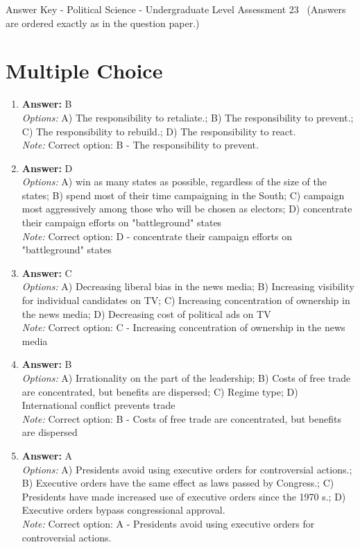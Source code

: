 \documentclass[12pt]{article}
\begin{document}
\begin{center}
Answer Key - Political Science - Undergraduate Level Assessment 23 \
\small (Answers are ordered exactly as in the question paper.)
\end{center}

\section*{Multiple Choice}
\begin{enumerate}[label=\arabic*.]
\item \textbf{Answer:} B
\\ \textit{Options:} A) The responsibility to retaliate.; B) The responsibility to prevent.; C) The responsibility to rebuild.; D) The responsibility to react.
\\ \textit{Note:} Correct option: B - The responsibility to prevent.
\item \textbf{Answer:} D
\\ \textit{Options:} A) win as many states as possible, regardless of the size of the states; B) spend most of their time campaigning in the South; C) campaign most aggressively among those who will be chosen as electors; D) concentrate their campaign efforts on "battleground" states
\\ \textit{Note:} Correct option: D - concentrate their campaign efforts on "battleground" states
\item \textbf{Answer:} C
\\ \textit{Options:} A) Decreasing liberal bias in the news media; B) Increasing visibility for individual candidates on TV; C) Increasing concentration of ownership in the news media; D) Decreasing cost of political ads on TV
\\ \textit{Note:} Correct option: C - Increasing concentration of ownership in the news media
\item \textbf{Answer:} B
\\ \textit{Options:} A) Irrationality on the part of the leadership; B) Costs of free trade are concentrated, but benefits are dispersed; C) Regime type; D) International conflict prevents trade
\\ \textit{Note:} Correct option: B - Costs of free trade are concentrated, but benefits are dispersed
\item \textbf{Answer:} A
\\ \textit{Options:} A) Presidents avoid using executive orders for controversial actions.; B) Executive orders have the same effect as laws passed by Congress.; C) Presidents have made increased use of executive orders since the 1970 s.; D) Executive orders bypass congressional approval.
\\ \textit{Note:} Correct option: A - Presidents avoid using executive orders for controversial actions.
\end{enumerate}
\end{document}
